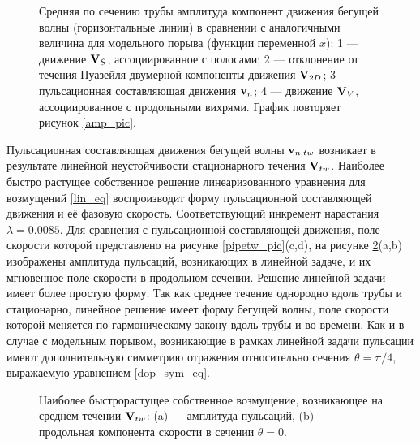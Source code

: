 \begin{figure}
\caption{Средняя по сечению трубы амплитуда компонент движения бегущей волны (горизонтальные линии) в сравнении с аналогичными величина для модельного порыва (функции переменной $x$): 1 --- движение $\mathbf{V}_S$, ассоциированное с полосами; 2 --- отклонение от течения Пуазейля двумерной компоненты движения $\mathbf{V}_{2D}$; 3 --- пульсационная составляющая движения $\mathbf{v}_n$; 4 --- движение $\mathbf{V}_V$, ассоциированное с продольными вихрями. График повторяет рисунок \ref{amp_pic}.}
\label{pipetw_amp_pic}
\end{figure}

Пульсационная составляющая движения бегущей волны $\mathbf{v}_{n,tw}$ возникает в результате линейной неустойчивости стационарного течения $\mathbf{V}_{tw}$. Наиболее быстро растущее собственное решение линеаризованного уравнения для возмущений \eqref{lin_eq} воспроизводит форму пульсационной составляющей движения и её фазовую скорость. Соответствующий инкремент нарастания $\lambda = 0.0085$. Для сравнения с пульсационной составляющей движения, поле скорости которой представлено на рисунке \ref{pipetw_pic}(c,d), на рисунке \ref{pipetw_lin_pic}(a,b) изображены амплитуда пульсаций, возникающих в линейной задаче, и их мгновенное поле скорости в продольном сечении. Решение линейной задачи имеет более простую форму. Так как среднее течение однородно вдоль трубы и стационарно, линейное решение имеет форму бегущей волны, поле скорости которой меняется по гармоническому закону вдоль трубы и во времени. Как и в случае с модельным порывом, возникающие в рамках линейной задачи пульсации имеют дополнительную симметрию отражения относительно сечения $\theta = \pi/4$, выражаемую уравнением \eqref{dop_sym_eq}. 


\begin{figure}
\caption{Наиболее быстрорастущее собственное возмущение, возникающее на среднем течении $\mathbf{V}_{tw}$: (a) --- амплитуда пульсаций, (b) --- продольная компонента скорости в сечении $\theta = 0$. }
\label{pipetw_lin_pic}
\end{figure}



